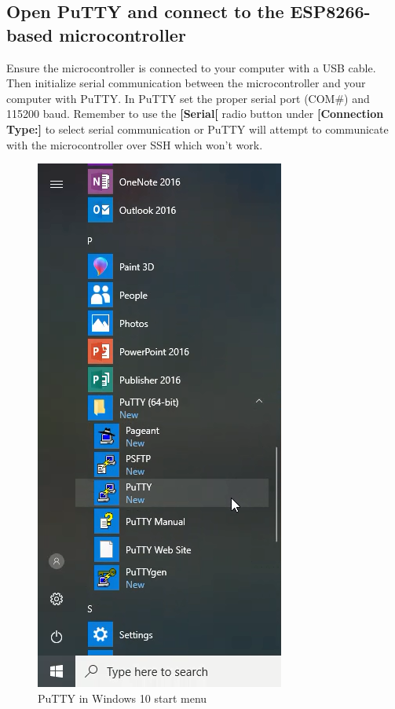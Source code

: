 \documentclass{book}
\makeatletter
\def\maxwidth{\ifdim\Gin@nat@width>\linewidth\linewidth
    \else\Gin@nat@width\fi}
\let\Oldincludegraphics\includegraphics
\renewcommand{\includegraphics}[1]{\Oldincludegraphics[width=.8\maxwidth]{#1}}
\makeatother
\begin{document}
    
        \subsection{Open PuTTY and connect to the ESP8266-based
microcontroller}\label{open-putty-and-connect-to-the-esp8266-based-microcontroller}
    




    
        Ensure the microcontroller is connected to your computer with a USB
cable. Then initialize serial communication between the microcontroller
and your computer with PuTTY. In PuTTY set the proper serial port
(COM\#) and 115200 baud. Remember to use the \textbf{{[}Serial{[}} radio
button under \textbf{{[}Connection Type:{]}} to select serial
communication or PuTTY will attempt to communicate with the
microcontroller over SSH which won't work.

\begin{figure}
\centering
\includegraphics{images/putty_in_start_menu.png}
\caption{PuTTY in Windows 10 start menu}
\end{figure}
\end{document}
